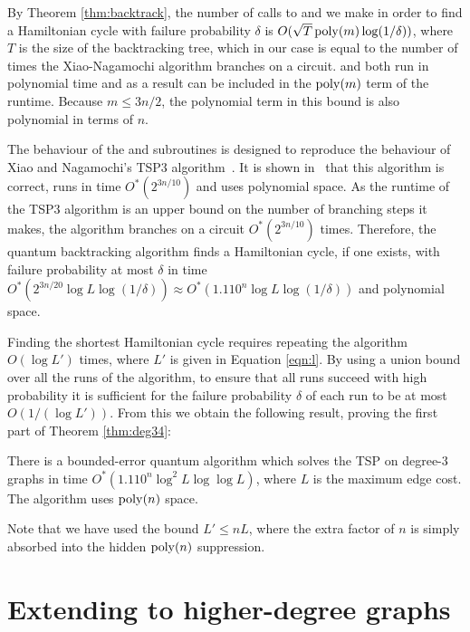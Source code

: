 By Theorem \ref{thm:backtrack}, the number of calls to \FnPredicatethree and \FnHeuristicthree we make in order to find a Hamiltonian cycle with failure probability $\delta$ is $O(\sqrt{T}\operatorname{poly}(m)\log (1/\delta))$, where $T$ is the size of the backtracking tree, which in our case is equal to the number of times the Xiao-Nagamochi algorithm branches on a circuit. \FnPredicatethree and \FnHeuristicthree both run in polynomial time and as a result can be included in the $\operatorname{poly}(m)$ term of the runtime. Because $m \leq 3n/2$, the polynomial term in this bound is also polynomial in terms of $n$.

The behaviour of the \FnPredicatethree and \FnHeuristicthree subroutines is designed to reproduce the behaviour of Xiao and Nagamochi's TSP3 algorithm~\cite{xiao2016degree3}. It is shown in~\cite[Theorem 1]{xiao2016degree3} that this algorithm is correct, runs in time $O^*(2^{3n/10})$ and uses polynomial space. As the runtime of the TSP3 algorithm is an upper bound on the number of branching steps it makes, the algorithm branches on a circuit $O^*(2^{3n/10})$ times. Therefore, the quantum backtracking algorithm finds a Hamiltonian cycle, if one exists, with failure probability at most $\delta$ in time $O^*(2^{3n/20}\log L \log(1/\delta)) \approx O^*(1.110^n\log L \log(1/\delta))$ and polynomial space.

Finding the shortest Hamiltonian cycle requires repeating the algorithm $O(\log L')$ times, where $L'$ is given in Equation \ref{eqn:l}. By using a union bound over all the runs of the algorithm, to ensure that all runs succeed with high probability it is sufficient for the failure probability $\delta$ of each run to be at most $O(1/(\log L'))$. From this we obtain the following result, proving the first part of Theorem \ref{thm:deg34}:

\begin{theorem}
There is a bounded-error quantum algorithm which solves the TSP on degree-3 graphs in time $O^*(1.110^n \log^2 L \log \log L)$, where $L$ is the maximum edge cost. The algorithm uses $\operatorname{poly}(n)$ space.
\end{theorem}

Note that we have used the bound $L' \le n L$, where the extra factor of $n$ is simply absorbed into the hidden $\operatorname{poly}(n)$ suppression.

\section{Extending to higher-degree graphs \label{sec:higher-bound}}


